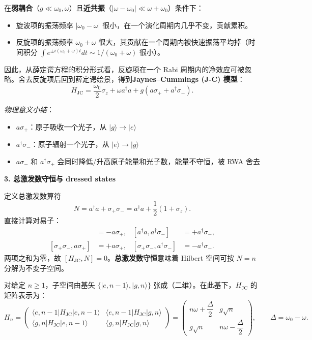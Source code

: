 在\textbf{弱耦合}（$g \ll \omega_0, \omega$）且\textbf{近共振}（$|\omega-\omega_0| \ll \omega+\omega_0$）条件下：
\begin{itemize}[nosep]
    \item 旋波项的振荡频率 $|\omega_0-\omega|$ 很小，在一个演化周期内几乎不变，贡献累积。
    \item 反旋项的振荡频率 $\omega_0+\omega$ 很大，其贡献在一个周期内被快速振荡平均掉（时间积分 $\int e^{\pm i(\omega_0+\omega)t} dt \sim 1/(\omega_0+\omega)$ 很小）。
\end{itemize}
因此，从薛定谔方程的积分形式看，反旋项在一个 Rabi 周期内的净效应可被忽略。舍去反旋项后回到薛定谔绘景，得到\textbf{Jaynes--Cummings (J-C) 模型}：
\[
\boxed{H_{\text{JC}} = \frac{\omega_0}{2}\sigma_z + \omega a^\dagger a + g(a\sigma_+ + a^\dagger\sigma_-)}.
\]

\textit{物理意义小结}：
\begin{itemize}[nosep]
    \item $a\sigma_+$：原子吸收一个光子，从 $|g\rangle\to|e\rangle$
    \item $a^\dagger\sigma_-$：原子辐射一个光子，从 $|e\rangle\to|g\rangle$
    \item $a\sigma_-$ 和 $a^\dagger\sigma_+$ 会同时降低/升高原子能量和光子数，能量不守恒，被 RWA 舍去
\end{itemize}

\textbf{3. 总激发数守恒与 dressed states}

定义总激发数算符
\[
N = a^\dagger a + \sigma_+\sigma_- = a^\dagger a + \frac{1}{2}(1+\sigma_z).
\]
直接计算对易子：
\begin{align*}
[a^\dagger a, a\sigma_+] &= -a\sigma_+, & [a^\dagger a, a^\dagger\sigma_-] &= +a^\dagger\sigma_-, \\
[\sigma_+\sigma_-, a\sigma_+] &= +a\sigma_+, & [\sigma_+\sigma_-, a^\dagger\sigma_-] &= -a^\dagger\sigma_-.
\end{align*}
两项之和为零，故 $[H_{\text{JC}}, N] = 0$。\textbf{总激发数守恒}意味着 Hilbert 空间可按 $N=n$ 分解为不变子空间。

对给定 $n\ge 1$，子空间由基矢 $\{|e,n-1\rangle, |g,n\rangle\}$ 张成（二维）。在此基下，$H_{\text{JC}}$ 的矩阵表示为：
\[
H_n = \begin{pmatrix}
\langle e,n-1|H_{\text{JC}}|e,n-1\rangle & \langle e,n-1|H_{\text{JC}}|g,n\rangle \\
\langle g,n|H_{\text{JC}}|e,n-1\rangle & \langle g,n|H_{\text{JC}}|g,n\rangle
\end{pmatrix}
= \begin{pmatrix}
n\omega + \dfrac{\Delta}{2} & g\sqrt{n} \\
g\sqrt{n} & n\omega - \dfrac{\Delta}{2}
\end{pmatrix},
\qquad \Delta = \omega_0 - \omega.
\]

